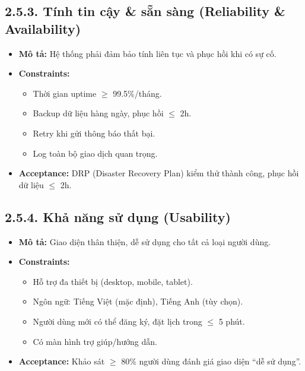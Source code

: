 
\subsection*{2.5.3. Tính tin cậy \& sẵn sàng (Reliability \& Availability)}
\begin{itemize}
    \item \textbf{Mô tả:} Hệ thống phải đảm bảo tính liên tục và phục hồi khi có sự cố.
    \item \textbf{Constraints:} 
    \begin{itemize}
        \item Thời gian uptime $\geq$ 99.5\%/tháng.
        \item Backup dữ liệu hàng ngày, phục hồi $\leq$ 2h.
        \item Retry khi gửi thông báo thất bại.
        \item Log toàn bộ giao dịch quan trọng.
    \end{itemize}
    \item \textbf{Acceptance:} DRP (Disaster Recovery Plan) kiểm thử thành công, phục hồi dữ liệu $\leq$ 2h.
\end{itemize}


\subsection*{2.5.4. Khả năng sử dụng (Usability)}
\begin{itemize}
    \item \textbf{Mô tả:} Giao diện thân thiện, dễ sử dụng cho tất cả loại người dùng.
    \item \textbf{Constraints:} 
    \begin{itemize}
        \item Hỗ trợ đa thiết bị (desktop, mobile, tablet).
        \item Ngôn ngữ: Tiếng Việt (mặc định), Tiếng Anh (tùy chọn).
        \item Người dùng mới có thể đăng ký, đặt lịch trong $\leq$ 5 phút.
        \item Có màn hình trợ giúp/hướng dẫn.
    \end{itemize}
    \item \textbf{Acceptance:} Khảo sát $\geq$ 80\% người dùng đánh giá giao diện “dễ sử dụng”.

\end{itemize}

